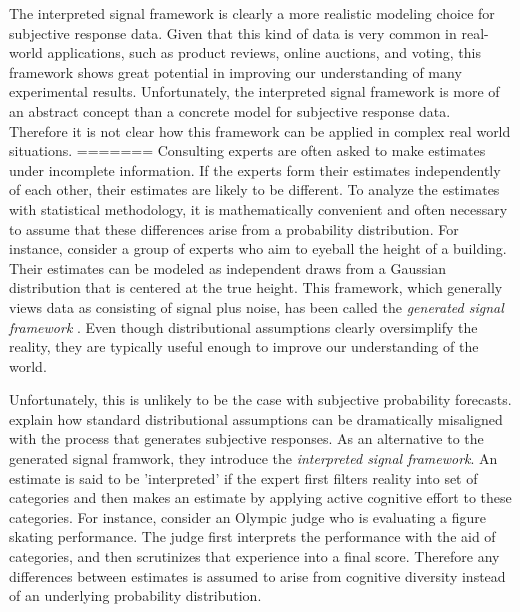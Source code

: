 \documentclass[11pt,twoside]{article}
\begin{document}

The interpreted signal framework is clearly a more realistic modeling choice for subjective response data. Given that this kind of data is very common in real-world applications, such as product reviews, online auctions, and voting, this framework shows great potential in improving our understanding of many experimental results. Unfortunately, the interpreted signal framework is more of an abstract concept than a concrete model for subjective response data. Therefore it is not clear how this framework can be applied in complex real world situations. 
=======
Consulting experts are often asked to make estimates under incomplete
information. If the experts form their estimates independently of each
other, their estimates are likely to be different. To analyze the
estimates with statistical methodology, it is mathematically
convenient and often necessary to assume that these differences arise
from a probability distribution. For instance, consider a group of
experts who aim to eyeball the height of a building. Their estimates
can be modeled as independent draws from a Gaussian distribution that
is centered at the true height. This framework, which generally views data as consisting of signal plus noise,
has been called the \textit{generated signal framework}  \cite{hong2009interpreted}. Even though distributional
assumptions clearly oversimplify the reality, they are typically
useful enough to improve our understanding of the world.


Unfortunately, this is unlikely to be the case with subjective
probability forecasts. \cite{hong2009interpreted} explain how standard
distributional assumptions can be dramatically misaligned with the
process that generates subjective responses. As an alternative to the
generated signal framwork, they introduce the \textit{interpreted
signal framework}. An estimate is said to be 'interpreted' if the expert
first filters reality into set of categories and then makes an
estimate by applying active cognitive effort to these categories. For
instance, consider an Olympic judge who is evaluating a figure skating
performance. The judge first interprets the performance with the aid
of categories, and then scrutinizes that experience into a final
score. Therefore any differences between estimates is assumed to arise
from cognitive diversity instead of an underlying probability
distribution.
\end{document}
